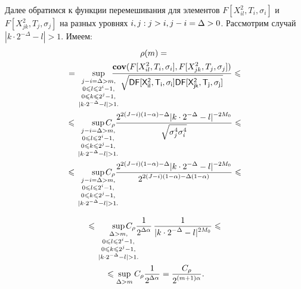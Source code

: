 \begin{multicols}{2}
Далее обратимся к функции перемешивания для элементов 
$F\left[X_{il}^2,T_i,\sigma_i\right]$ и 
$F\left[X_{jk}^2,T_j,\sigma_j\right]$ на разных уровнях $i,j: j\hm>i, j\hm-i\hm=\Delta\hm>0$.
Рассмотрим случай $|k\cdot 2^{-\Delta}-l|>1$. Имеем:
\begin{multline*}
\rho(m)
={}\\
{}=\sup\limits_{{\begin{smallmatrix}j-i=\Delta>m,\\ 
0\leqslant l\leqslant2^i-1,\\
0\leqslant k\leqslant2^j-1,\\|k\cdot2^{-\Delta}-l|>1.\end{smallmatrix}}}
\!\!\!\!\!\!\!\fr{\cov(F[X_{il}^2,T_i,\sigma_i],F[X_{jk}^2,T_j,\sigma_j])}
{\sqrt{\Variance F[X_{il}^2,T_i,\sigma_i] \Variance F[X_{jk}^2,T_j,\sigma_j]}}\leqslant{}\\
{}\leqslant \sup\limits_{{\begin{smallmatrix}j-i=\Delta>m,\\ 0\leqslant
 l\leqslant2^i-1,\\ 0\leqslant k\leqslant2^j-1,\\|k\cdot2^{-\Delta}-l|>1.\end{smallmatrix}}} 
 \!\!\!\!\!\!\!\!\!\!\!C_\rho\fr{2^{2(J-i)(1-\alpha) -\Delta} |k\cdot2^{-\Delta}-l|^{-2M_0}}
 {\sqrt{\sigma^4_j\sigma^4_i}}\leqslant{}\\
  {}\leqslant\sup\limits_{{\begin{smallmatrix}j-i=\Delta>m,\\ 0\leqslant l\leqslant2^i-1,\\ 0\leqslant k\leqslant2^j-1,\\|k\cdot2^{-\Delta}-l|>1.\end{smallmatrix}}} 
\!\!\!\!\!\!\!\!\!\!\!C_\rho\fr{2^{2(J-i)(1-\alpha) -\Delta} |k\cdot2^{-\Delta}-l|^{-2M_0}}{2^{2(J-i)(1-\alpha) -\Delta(1-\alpha)}}
\leqslant{}  %
\end{multline*}

\noindent
\begin{multline*} 
{}\leqslant \sup\limits_{{\begin{smallmatrix}\Delta>m,\\ 0\leqslant l\leqslant2^i-1,\\ 0\leqslant k\leqslant2^j-1,\\|k\cdot2^{-\Delta}-l|>1.\end{smallmatrix}}} 
\!\!\!\!\!\!\!\!\!\!\!C_\rho\fr{1}{2^{\Delta\alpha}}\,\fr{1}{|k\cdot2^{-\Delta}-l|^{2M_0}}\leqslant{}\\
{}\leqslant \sup_{\Delta>m}  C_\rho\fr{1}{2^{\Delta\alpha}}
=\fr{C_\rho}{2^{(m+1)\alpha}}. %
\end{multline*}


\end{multicols}
